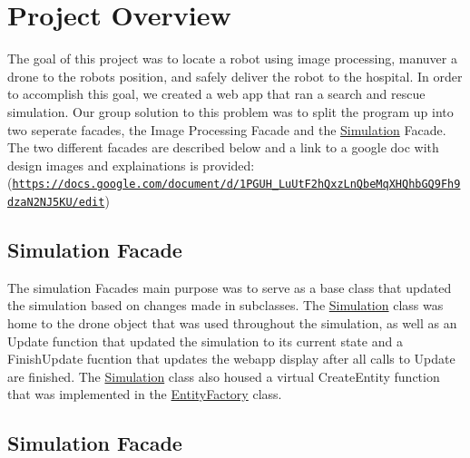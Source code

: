 \hypertarget{index_overview}{}\section{Project Overview}\label{index_overview}
The goal of this project was to locate a robot using image processing, manuver a drone to the robot\textquotesingle{}s position, and safely deliver the robot to the hospital. In order to accomplish this goal, we created a web app that ran a search and rescue simulation. Our group solution to this problem was to split the program up into two seperate facades, the Image Processing Facade and the \hyperlink{classSimulation}{Simulation} Facade. The two different facades are described below and a link to a google doc with design images and explainations is provided\+: (\href{https://docs.google.com/document/d/1PGUH_LuUtF2hQxzLnQbeMqXHQhbGQ9Fh9dzaN2NJ5KU/edit}{\tt https\+://docs.\+google.\+com/document/d/1\+P\+G\+U\+H\+\_\+\+Lu\+Ut\+F2h\+Qxz\+Ln\+Qbe\+Mq\+X\+H\+Qhb\+G\+Q9\+Fh9dza\+N2\+N\+J5\+K\+U/edit})\hypertarget{index_simulation}{}\subsection{Simulation Facade}\label{index_simulation}
The simulation Facade\textquotesingle{}s main purpose was to serve as a base class that updated the simulation based on changes made in subclasses. The \hyperlink{classSimulation}{Simulation} class was home to the drone object that was used throughout the simulation, as well as an Update function that updated the simulation to it\textquotesingle{}s current state and a Finish\+Update fucntion that updates the webapp display after all calls to Update are finished. The \hyperlink{classSimulation}{Simulation} class also housed a virtual Create\+Entity function that was implemented in the \hyperlink{classEntityFactory}{Entity\+Factory} class.\hypertarget{index_simulation}{}\subsection{Simulation Facade}\label{index_simulation}
